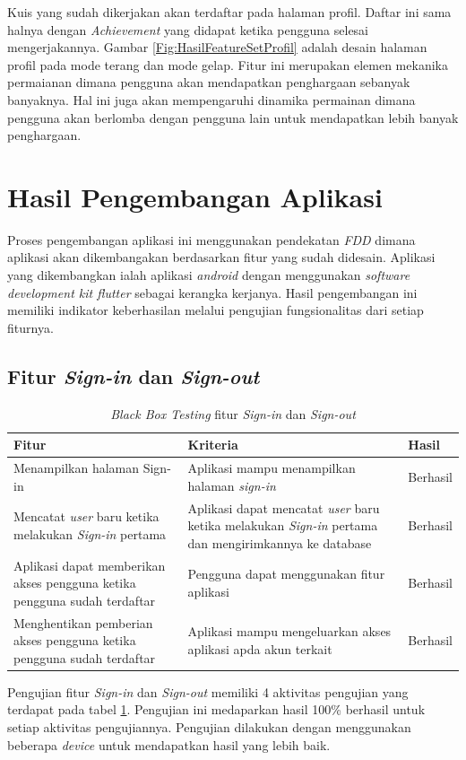Kuis yang sudah dikerjakan akan terdaftar pada halaman profil. Daftar ini sama halnya dengan \textit{Achievement} yang didapat ketika pengguna selesai mengerjakannya.
Gambar \ref*{Fig:HasilFeatureSetProfil} adalah desain halaman profil pada mode terang dan mode gelap. Fitur ini merupakan elemen mekanika permaianan dimana pengguna akan mendapatkan penghargaan sebanyak banyaknya.
Hal ini juga akan mempengaruhi dinamika permainan dimana pengguna akan berlomba dengan pengguna lain untuk mendapatkan lebih banyak penghargaan. 
\section{Hasil Pengembangan Aplikasi}
Proses pengembangan aplikasi ini menggunakan pendekatan \textit{FDD} dimana aplikasi akan dikembangakan berdasarkan fitur yang sudah didesain.
Aplikasi yang dikembangkan ialah aplikasi \textit{android} dengan menggunakan \textit{software development kit flutter} sebagai kerangka kerjanya.
Hasil pengembangan ini memiliki indikator keberhasilan melalui pengujian fungsionalitas dari setiap fiturnya.
\subsection{Fitur \textit{Sign-in} dan \textit{Sign-out}}
\begin{table}[H]
	\centering
	\caption{\textit{Black Box Testing} fitur \textit{Sign-in} dan \textit{Sign-out}}
	\label{Tab:blackBoxSign}
	\begin{tabular}{|p{}|p{}|p{}|}
		\hline
		 \centering\textbf{Fitur} & \multicolumn{1}{m{0.45\textwidth}|}{\centering \textbf{Kriteria}}&  \multicolumn{1}{m{0.1\textwidth}|}{\centering \textbf{Hasil}}\\
		\hline
		Menampilkan halaman Sign-in 
		& Aplikasi mampu menampilkan halaman \textit{sign-in} 
		& Berhasil\\
		\hline
		Mencatat \textit{user} baru ketika melakukan \textit{Sign-in} pertama 
		& Aplikasi dapat mencatat \textit{user} baru ketika melakukan \textit{Sign-in} pertama dan mengirimkannya ke database
		& Berhasil\\
		\hline
		Aplikasi dapat memberikan akses pengguna ketika pengguna sudah terdaftar
		& Pengguna dapat menggunakan fitur aplikasi
		& Berhasil\\
		\hline
		Menghentikan pemberian akses pengguna ketika pengguna sudah terdaftar
		& Aplikasi mampu mengeluarkan akses aplikasi apda akun terkait
		& Berhasil\\
		\hline
	\end{tabular}
\end{table}
Pengujian fitur \textit{Sign-in} dan \textit{Sign-out} memiliki 4 aktivitas pengujian yang terdapat pada tabel \ref*{Tab:blackBoxSign}.
Pengujian ini medaparkan hasil 100\% berhasil untuk setiap aktivitas pengujiannya. Pengujian dilakukan dengan menggunakan beberapa \textit{device} untuk mendapatkan hasil yang lebih baik.
